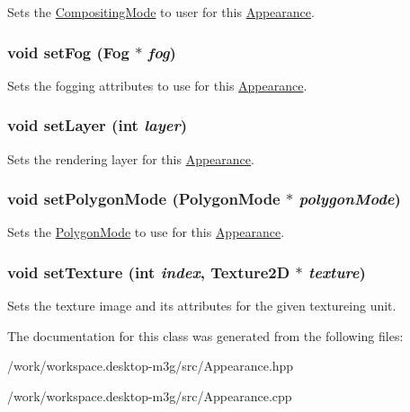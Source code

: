 Sets the \hyperlink{classm3g_1_1CompositingMode}{CompositingMode} to user for this \hyperlink{classm3g_1_1Appearance}{Appearance}. \hypertarget{classm3g_1_1Appearance_bc1a612006d6b4c3d443ff6ab542c788}{
\subsubsection[{setFog}]{\setlength{\rightskip}{0pt plus 5cm}void setFog ({\bf Fog} $\ast$ {\em fog})}}
\label{classm3g_1_1Appearance_bc1a612006d6b4c3d443ff6ab542c788}


Sets the fogging attributes to use for this \hyperlink{classm3g_1_1Appearance}{Appearance}. \hypertarget{classm3g_1_1Appearance_fbd2fbd594c8ee140b028f505631f682}{
\subsubsection[{setLayer}]{\setlength{\rightskip}{0pt plus 5cm}void setLayer (int {\em layer})}}
\label{classm3g_1_1Appearance_fbd2fbd594c8ee140b028f505631f682}


Sets the rendering layer for this \hyperlink{classm3g_1_1Appearance}{Appearance}. \hypertarget{classm3g_1_1Appearance_cc21fac7868e2ad37e689ac642db1aae}{
\subsubsection[{setPolygonMode}]{\setlength{\rightskip}{0pt plus 5cm}void setPolygonMode ({\bf PolygonMode} $\ast$ {\em polygonMode})}}
\label{classm3g_1_1Appearance_cc21fac7868e2ad37e689ac642db1aae}


Sets the \hyperlink{classm3g_1_1PolygonMode}{PolygonMode} to use for this \hyperlink{classm3g_1_1Appearance}{Appearance}. \hypertarget{classm3g_1_1Appearance_493e54b1c7ab839b9e76b28e0629cf6a}{
\subsubsection[{setTexture}]{\setlength{\rightskip}{0pt plus 5cm}void setTexture (int {\em index}, \/  {\bf Texture2D} $\ast$ {\em texture})}}
\label{classm3g_1_1Appearance_493e54b1c7ab839b9e76b28e0629cf6a}


Sets the texture image and its attributes for the given textureing unit. 

The documentation for this class was generated from the following files:\begin{CompactItemize}
\item 
/work/workspace.desktop-m3g/src/Appearance.hpp\item 
/work/workspace.desktop-m3g/src/Appearance.cpp\end{CompactItemize}
